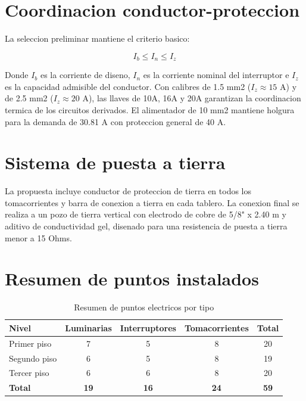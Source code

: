 \section{Coordinacion conductor-proteccion}

La seleccion preliminar mantiene el criterio basico:

\begin{equation}
I_b \leq I_n \leq I_z
\end{equation}

Donde $I_b$ es la corriente de diseno, $I_n$ es la corriente nominal del interruptor e $I_z$ es la capacidad admisible del conductor. Con calibres de 1.5 mm2 ($I_z \approx 15\text{ A}$) y de 2.5 mm2 ($I_z \approx 20\text{ A}$), las llaves de 10A, 16A y 20A garantizan la coordinacion termica de los circuitos derivados. El alimentador de 10 mm2 mantiene holgura para la demanda de 30.81 A con proteccion general de 40 A.

\section{Sistema de puesta a tierra}

La propuesta incluye conductor de proteccion de tierra en todos los tomacorrientes y barra de conexion a tierra en cada tablero. La conexion final se realiza a un pozo de tierra vertical con electrodo de cobre de 5/8" x 2.40 m y aditivo de conductividad gel, disenado para una resistencia de puesta a tierra menor a 15 Ohms.

\section{Resumen de puntos instalados}

\begin{table}[H]
\centering
\small
\caption{Resumen de puntos electricos por tipo}
\label{tab:resumen-puntos}
\begin{tabularx}{\textwidth}{L{3.5cm} c c c c}
\toprule
\textbf{Nivel} & \textbf{Luminarias} & \textbf{Interruptores} & \textbf{Tomacorrientes} & \textbf{Total} \\
\midrule
Primer piso & 7 & 5 & 8 & 20 \\
Segundo piso & 6 & 5 & 8 & 19 \\
Tercer piso & 6 & 6 & 8 & 20 \\
\midrule
\textbf{Total} & \textbf{19} & \textbf{16} & \textbf{24} & \textbf{59} \\
\bottomrule
\end{tabularx}
\end{table}

